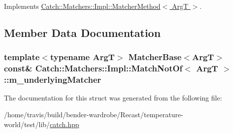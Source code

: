 Implements \hyperlink{struct_catch_1_1_matchers_1_1_impl_1_1_matcher_method_ae0920ff9e817acf08e1bb0cbcb044e30}{Catch\-::\-Matchers\-::\-Impl\-::\-Matcher\-Method$<$ Arg\-T $>$}.



\subsection{Member Data Documentation}
\hypertarget{struct_catch_1_1_matchers_1_1_impl_1_1_match_not_of_af7ac67f112b0e93796b048a47329aad4}{
\subsubsection[{m\-\_\-underlying\-Matcher}]{\setlength{\rightskip}{0pt plus 5cm}template$<$typename Arg\-T$>$ {\bf Matcher\-Base}$<$Arg\-T$>$ const\& {\bf Catch\-::\-Matchers\-::\-Impl\-::\-Match\-Not\-Of}$<$ Arg\-T $>$\-::m\-\_\-underlying\-Matcher}}\label{struct_catch_1_1_matchers_1_1_impl_1_1_match_not_of_af7ac67f112b0e93796b048a47329aad4}


The documentation for this struct was generated from the following file\-:\begin{DoxyCompactItemize}
\item 
/home/travis/build/bender-\/wardrobe/\-Recast/temperature-\/world/test/lib/\hyperlink{catch_8hpp}{catch.\-hpp}\end{DoxyCompactItemize}
